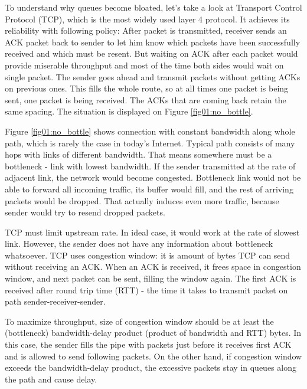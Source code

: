 To understand why queues become bloated, let's take a look at Transport Control Protocol (TCP), which is the most widely used layer 4 protocol. It achieves its reliability with following policy: After packet is transmitted, receiver sends an ACK packet back to sender to let him know which packets have been successfully received and which must be resent. But waiting on ACK after each packet would provide miserable throughput and most of the time both sides would wait on single packet. The sender goes ahead and transmit packets without getting ACKs on previous ones. This fills the whole route, so at all times one packet is being sent, one packet is being received. The ACKs that are coming back retain the same spacing. The situation is displayed on Figure \ref{fig01:no_bottle}.

Figure \ref{fig01:no_bottle} shows connection with constant bandwidth along whole path, which is rarely the case in today's Internet. Typical path consists of many hops with links of different bandwidth. That means somewhere must be a bottleneck - link with lowest bandwidth. If the sender transmitted at the rate of adjacent link, the network would become congested. Bottleneck link would not be able to forward all incoming traffic, its buffer would fill, and the rest of arriving packets would be dropped. That actually induces even more traffic, because sender would try to resend dropped packets.


TCP must limit upstream rate. In ideal case, it would work at the rate of slowest link. However, the sender does not have any information about bottleneck whatsoever. TCP uses congestion window: it is amount of bytes TCP can send without receiving an ACK. When an ACK is received, it frees space in congestion window, and next packet can be sent, filling the window again. The first ACK is received after round trip time (RTT) - the time it takes to transmit packet on path sender-receiver-sender.

To maximize throughput, size of congestion window should be at least the (bottleneck) bandwidth-delay product (product of bandwidth and RTT) bytes. In this case, the sender fills the pipe with packets just before it receives first ACK and is allowed to send following packets. On the other hand, if congestion window exceeds the bandwidth-delay product, the excessive packets stay in queues along the path and cause delay. 




